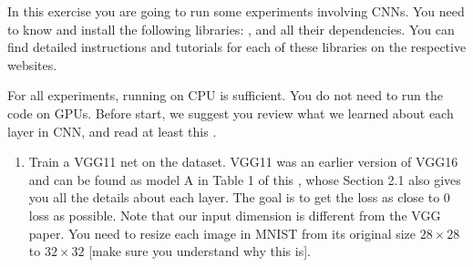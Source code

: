 \documentclass{tron}
\begin{document}
\setcounter{section}{1}
\begin{exercise}{}
	
	
	In this exercise you are going to run some experiments involving CNNs. You need to know \href{https://www.python.org/}{} and install the following libraries: \href{https://pytorch.org/get-started/locally/}{}, \href{https://matplotlib.org/}{} and all their dependencies. You can find detailed instructions and tutorials for each of these libraries on the respective websites. 
	
	For all experiments, running on CPU is sufficient. You do not need to run the code on GPUs.
	Before start, we suggest you review what we learned about each layer in CNN, and read at least this \href{https://pytorch.org/tutorials/beginner/blitz/neural_networks_tutorial.html}{}.
	
	\begin{enumerate}
		\item Train a VGG11 net on the \href{https://pytorch.org/vision/0.9/datasets.html#mnist}{} dataset. 
		VGG11 was an earlier version of VGG16 and can be found as model A in Table 1 of this \href{https://arxiv.org/pdf/1409.1556.pdf}{}, whose Section 2.1 also gives you all the details about each layer.
		The goal is to get the loss as close to 0 loss as possible. Note that our input dimension is different from the VGG paper. You need to resize each image in MNIST from its original size $28 \times 28$ to $32 \times 32$ [make sure you understand why this is].
		

\end{enumerate}
\end{exercise}
\end{document}
